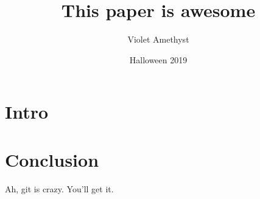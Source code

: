 \documentclass{article}
\title{This paper is awesome}
\date{Halloween 2019}
\author{Violet Amethyst}
\begin{document}
\maketitle


\section{Intro}


\section{Conclusion}

Ah, git is crazy.  You'll get it.
\end{document}
